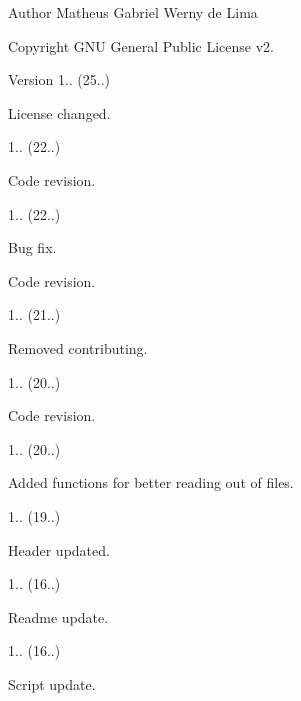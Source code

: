 \begin{DoxyAuthor}{Author}
Matheus Gabriel Werny de Lima 
\end{DoxyAuthor}
\begin{DoxyCopyright}{Copyright}
G\+NU General Public License v2. 
\end{DoxyCopyright}
\begin{DoxyVersion}{Version}
1.. (25..)
\begin{DoxyItemize}
\item License changed. 
\end{DoxyItemize}

1.. (22..)
\begin{DoxyItemize}
\item Code revision. 
\end{DoxyItemize}

1.. (22..)
\begin{DoxyItemize}
\item Bug fix.
\item Code revision. 
\end{DoxyItemize}

1.. (21..)
\begin{DoxyItemize}
\item Removed contributing. 
\end{DoxyItemize}

1.. (20..)
\begin{DoxyItemize}
\item Code revision. 
\end{DoxyItemize}

1.. (20..)
\begin{DoxyItemize}
\item Added functions for better reading out of files. 
\end{DoxyItemize}

1.. (19..)
\begin{DoxyItemize}
\item Header updated. 
\end{DoxyItemize}

1.. (16..)
\begin{DoxyItemize}
\item Readme update. 
\end{DoxyItemize}

1.. (16..)
\begin{DoxyItemize}
\item Script update. 
\end{DoxyItemize}


\end{DoxyVersion}
